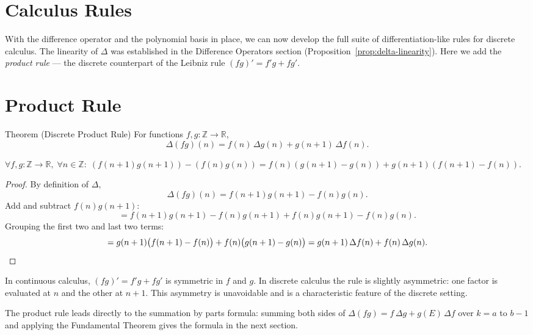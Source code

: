 
\section{Calculus Rules}
\label{sec:calculus-rules}

With the difference operator and the polynomial basis in place, we can
now develop the full suite of differentiation-like rules for discrete
calculus. The linearity of \(\Delta\) was established in the Difference
Operators section (Proposition~\ref{prop:delta-linearity}). Here we add
the \emph{product rule} --- the discrete counterpart of the Leibniz rule
\((fg)' = f'g + fg'\).

\section*{Product Rule}

\begin{theorembox}{Theorem (Discrete Product Rule)}
For functions \(f, g : \mathbb{Z} \to \mathbb{R}\),
\[
\Delta(fg)(n)
=
f(n)\,\Delta g(n) + g(n+1)\,\Delta f(n).
\]
\end{theorembox}
\label{thm:product-rule}

\begin{remark*}
\(\forall f,g : \mathbb{Z}\to\mathbb{R},\; \forall n \in \mathbb{Z}:\;
(f(n+1)g(n+1)) - (f(n)g(n))
= f(n)(g(n+1)-g(n)) + g(n+1)(f(n+1)-f(n))\).
\end{remark*}

\begin{proof}
By definition of \(\Delta\),
\[
\Delta(fg)(n) = f(n+1)g(n+1) - f(n)g(n).
\]
Add and subtract \(f(n)g(n+1)\):
\[
= f(n+1)g(n+1) - f(n)g(n+1) + f(n)g(n+1) - f(n)g(n).
\]
Grouping the first two and last two terms:
\[
= g(n+1)\bigl(f(n+1)-f(n)\bigr) + f(n)\bigl(g(n+1)-g(n)\bigr)
= g(n+1)\,\Delta f(n) + f(n)\,\Delta g(n). \qedhere
\]
\end{proof}

\begin{remark*}
In continuous calculus, \((fg)' = f'g + fg'\) is symmetric in \(f\)
and \(g\). In discrete calculus the rule is slightly asymmetric: one
factor is evaluated at \(n\) and the other at \(n+1\). This asymmetry
is unavoidable and is a characteristic feature of the discrete setting.
\end{remark*}

\begin{remark*}
The product rule leads directly to the summation by parts formula:
summing both sides of \(\Delta(fg) = f\,\Delta g + g(E)\,\Delta f\)
over \(k = a\) to \(b-1\) and applying the Fundamental Theorem gives
the formula in the next section.
\end{remark*}
